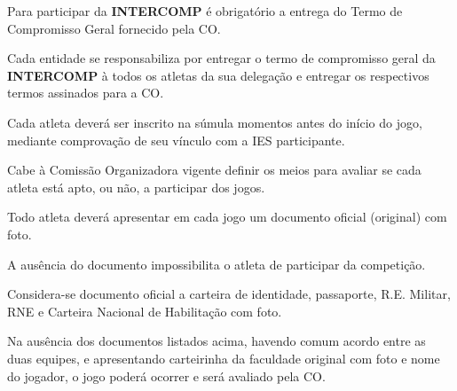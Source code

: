 \begin{article}
	Para participar da \textbf{INTERCOMP} é obrigatório a entrega do Termo de Compromisso Geral fornecido pela CO.

	\begin{xparagraph}
		Cada entidade se responsabiliza por entregar o termo de compromisso geral da \textbf{INTERCOMP} à todos os atletas da sua delegação e entregar os respectivos termos assinados para a CO.
	\end{xparagraph}
\end{article}

\begin{article}
	Cada atleta deverá ser inscrito na súmula momentos antes do início do jogo, mediante comprovação de seu vínculo com a IES participante.

	\begin{xparagraph}
		Cabe à Comissão Organizadora vigente definir os meios para avaliar se cada atleta está apto, ou não, a participar dos jogos.
	\end{xparagraph}
\end{article}

\begin{article}
	Todo atleta deverá apresentar em cada jogo um documento oficial (original) com foto.

	\begin{xparagraph}
		A ausência do documento impossibilita o atleta de participar da competição.
	\end{xparagraph}

	\begin{xparagraph}
		Considera-se documento oficial a carteira de identidade, passaporte, R.E. Militar, RNE e Carteira Nacional de Habilitação com foto.
	\end{xparagraph}

	\begin{xparagraph}
		Na ausência dos documentos listados acima, havendo comum acordo entre as duas equipes, e apresentando carteirinha da faculdade original com foto e nome do jogador, o jogo poderá ocorrer e será avaliado pela CO.
	\end{xparagraph}
\end{article}

